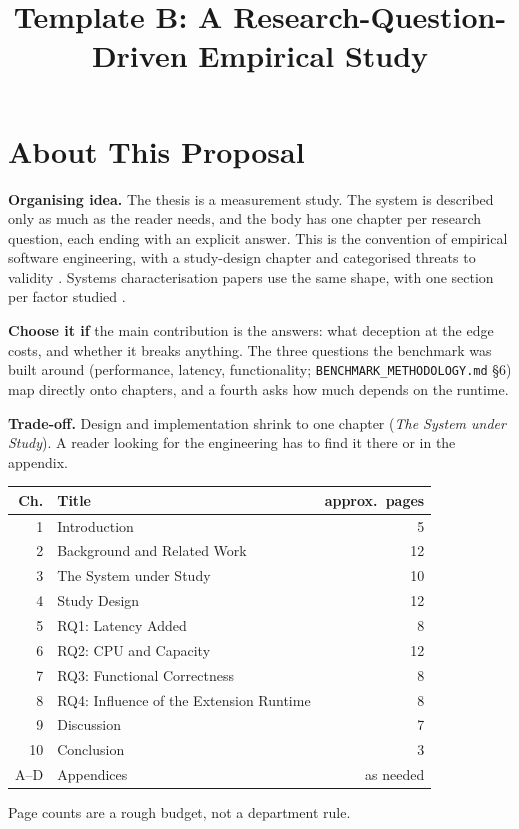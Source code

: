 \documentclass{rptuma}
\title{Template B: A Research-Question-Driven Empirical Study}
\begin{document}
\maketitle
{}
\setcounter{page}{1}

\chapter*{About This Proposal}

\textbf{Organising idea.} The thesis is a measurement study. The system is described only as much
as the reader needs, and the body has one chapter per research question, each ending with an
explicit answer. This is the convention of empirical software engineering, with a study-design
chapter and categorised threats to validity \cite{wohlin2012experimentation}. Systems
characterisation papers use the same shape, with one section per factor studied
\cite{zhu2022dissecting}.

\textbf{Choose it if} the main contribution is the answers: what deception at the edge costs, and
whether it breaks anything. The three questions the benchmark was built around (performance,
latency, functionality; \texttt{BENCHMARK\_METHODOLOGY.md} \S6) map directly onto chapters, and a
fourth asks how much depends on the runtime.

\textbf{Trade-off.} Design and implementation shrink to one chapter (\emph{The System under
Study}). A reader looking for the engineering has to find it there or in the appendix.

\begin{center}
\small
\begin{tabularx}{\textwidth}{@{}rXr@{}}
\toprule
Ch. & Title & approx.\ pages \\
\midrule
1 & Introduction & 5 \\
2 & Background and Related Work & 12 \\
3 & The System under Study & 10 \\
4 & Study Design & 12 \\
5 & RQ1: Latency Added & 8 \\
6 & RQ2: CPU and Capacity & 12 \\
7 & RQ3: Functional Correctness & 8 \\
8 & RQ4: Influence of the Extension Runtime & 8 \\
9 & Discussion & 7 \\
10 & Conclusion & 3 \\
A--D & Appendices & as needed \\
\bottomrule
\end{tabularx}
\end{center}
{\footnotesize Page counts are a rough budget, not a department rule.}
\end{document}
